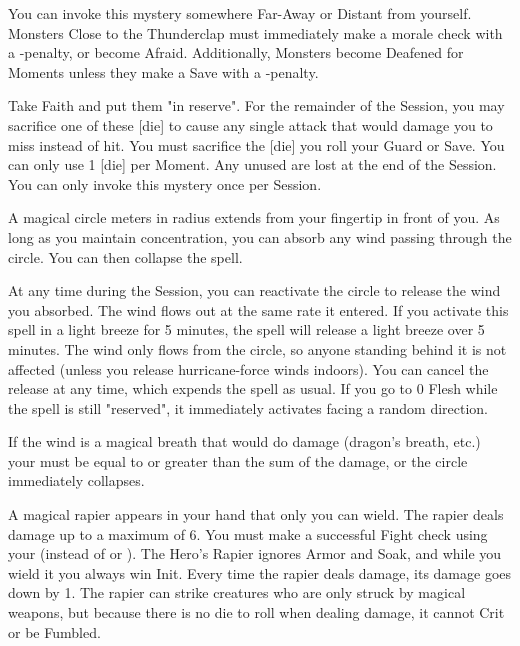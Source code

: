{You can invoke this mystery somewhere Far-Away or Distant from yourself.  Monsters Close to the Thunderclap must immediately make a morale check with a -\DICE penalty, or become Afraid.  Additionally, Monsters become Deafened for \DICE Moments unless they make a Save with a -\DICE penalty.

\newpage

\MYSTERY [
  Name = Armor of Winds,
  Link = arcana-mystery-armor-of-winds,
  Paradigm = Entropy,
  Save = n/a,
  Duration = Session,
  Target = Self
]

Take \DICE Faith and put them "in reserve".  For the remainder of the Session, you may sacrifice one of these [die] to cause any single  attack that would damage you to miss instead of hit.  You must sacrifice the [die]  you roll your Guard or Save.  You can only use 1 [die] per Moment.  Any unused \DICE are lost at the end of the Session.  You can only invoke this mystery once per Session.

\MYSTERY [
  Name = Capture Wind,
  Link = arcana-mystery-capture-wind,
  Paradigm = Elements,
  Save = N,
  Duration = Concentration or Session,
  Target = See Below
]

A magical circle \DICE meters in radius extends from your fingertip in front of you. As long as you maintain concentration, you can absorb any wind passing through the circle. You can then collapse the spell. 

At any time during the Session, you can reactivate the circle to release the wind you absorbed.  The wind flows out at the same rate it entered. If you activate this spell in a light breeze for 5 minutes, the spell will release a light breeze over 5 minutes. The wind only flows from the circle, so anyone standing behind it is not affected (unless you release hurricane-force winds indoors). You can cancel the release at any time, which expends the spell as usual. If you go to 0 Flesh while the spell is still "reserved", it immediately activates facing a random direction.  

If the wind is a magical breath that would do damage (dragon's breath, etc.) your \SUMDICE must be equal to or greater than the sum of the damage, or the circle immediately collapses.  

\MYSTERY [
  Name = Corsair's Blade,
  Link = arcana-mystery-corsairs-blade,
  Paradigm = Force,
  Save = n/a,
  Duration = Session,
  Target = Self
]

A magical rapier appears in your hand that only you can wield.  The rapier deals \DICE damage up to a maximum of 6.  You must make a successful Fight check using your \FOC (instead of \VIG or \DEX).  The Hero's Rapier ignores Armor and Soak, and while you wield it you always win Init.  Every time the rapier deals damage, its damage goes down by 1. The rapier can strike creatures who are only struck by magical weapons, but because there is no die to roll when dealing damage, it cannot Crit or be Fumbled.  

}
